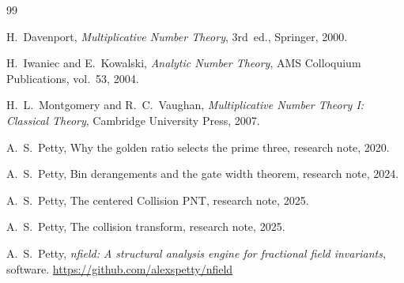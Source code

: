 \documentclass[12pt]{amsart}
\theoremstyle{definition}
\theoremstyle{remark}
\begin{document}
\begin{thebibliography}{99}

H.~Davenport,
\emph{Multiplicative Number Theory},
3rd~ed., Springer, 2000.

H.~Iwaniec and E.~Kowalski,
\emph{Analytic Number Theory},
AMS Colloquium Publications, vol.~53, 2004.

H.~L.~Montgomery and R.~C.~Vaughan,
\emph{Multiplicative Number Theory I: Classical Theory},
Cambridge University Press, 2007.

A.~S.~Petty,
Why the golden ratio selects the prime three,
research note, 2020.

A.~S.~Petty,
Bin derangements and the gate width theorem,
research note, 2024.

A.~S.~Petty,
The centered Collision PNT,
research note, 2025.

A.~S.~Petty,
The collision transform,
research note, 2025.

A.~S.~Petty,
\emph{nfield: A structural analysis engine for fractional field
invariants},
software.
\url{https://github.com/alexspetty/nfield}

\end{thebibliography}
\end{document}
